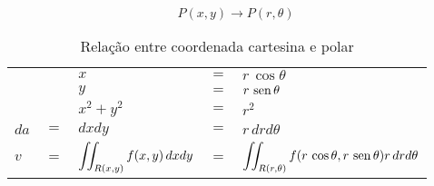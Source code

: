 	$$P(x,y) \rightarrow P(r,\theta)$$
	
	\begin{table}[H]
		\centering
		\begin{tabular}{|lclcl|}
			     &     & $x$                                 & $=$ & $r\,\cos \theta$                                                         \\
			     &     & $y$                                 & $=$ & $r\,\operatorname{sen} \theta$                                                         \\
			     &     & $x^2 + y^2$                         & $=$ & $r^2$                                                                    \\
			$da$ & $=$ & $dxdy$                              & $=$ & $r\,drd\theta$                                                           \\
			$v$  & $=$ & $\displaystyle\iint_{R(x,y)} f(x,y)\, dxdy$ & $=$ & $\displaystyle\iint_{R(r,\theta)} f(r\,\cos \theta,r\,\operatorname{sen} \theta) r\,drd\theta$
		\end{tabular}
		\caption{Relação entre coordenada cartesina e polar}
		\label{relacao_coordenada_cartesiana_polar}
	\end{table}